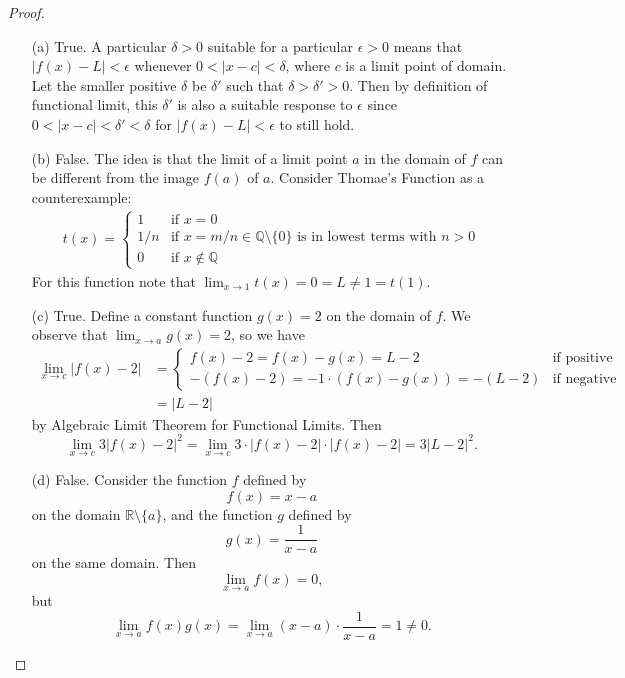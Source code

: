 \documentclass[11pt,twoside, reqno]{amsart}
\theoremstyle{remark}
\def\R{\mathbb R}
\def\Q{\mathbb Q}
\begin{document}
\begin{proof}
\begin{enumerate}
    \item [(a)] True. A particular $\delta > 0$ suitable for a particular $\epsilon > 0$ means that $|f(x) - L| < \epsilon$ whenever $0 < |x - c| < \delta$, where $c$ is a limit point of domain. Let the smaller positive $\delta$ be $\delta'$ such that $\delta > \delta' > 0$. Then by definition of functional limit, this $\delta'$ is also a suitable response to $\epsilon$ since $0 < |x - c| < \delta' < \delta$ for $|f(x) - L| < \epsilon$ to still hold.
    \item [(b)] False. The idea is that the limit of a limit point $a$ in the domain of $f$ can be different from the image $f(a)$ of $a$. Consider Thomae's Function as a counterexample:
    \begin{align*}
        t(x) = 
            \begin{cases}
                1 & \text{if $x = 0$} \\
                1/n & \text{if $x = m/n \in \Q \setminus \{0\}$ is in lowest terms with $n > 0$} \\
                0 & \text{if $x \not \in \Q$}
            \end{cases}
    \end{align*}
    For this function note that $\lim_{x \to 1} t(x) = 0 = L \neq 1 = t(1)$. 
    \item [(c)] True. Define a constant function $g(x) = 2$ on the domain of $f$. We observe that $\lim_{x \to a} g(x) = 2$, so we have
    \begin{align*}
        \lim_{x \to c} |f(x) - 2| & = 
            \begin{cases}
                f(x) - 2 = f(x) - g(x) = L - 2 & \text{if positive} \\
                - (f(x) - 2) = -1 \cdot (f(x) - g(x)) = - (L - 2) & \text{if negative}
            \end{cases}
            \\
            & = |L - 2|
    \end{align*}
    by Algebraic Limit Theorem for Functional Limits. Then
    $$
        \lim_{x \to c} 3|f(x) - 2|^2 = \lim_{x \to c} 3 \cdot |f(x) - 2| \cdot |f(x) - 2| = 3|L - 2|^2.
    $$
    \item [(d)] False. Consider the function $f$ defined by
    $$
        f(x) = x - a
    $$
    on the domain $\R \setminus \{a\}$, and the function $g$ defined by
    $$
        g(x) = \frac{1}{x-a}
    $$
    on the same domain. Then
    $$
        \lim_{x \to a} f(x) = 0,
    $$
    but
    $$
        \lim_{x \to a} f(x)g(x) = \lim_{x \to a} (x - a) \cdot \frac{1}{x-a} = 1 \neq 0.
    $$
\end{enumerate}

\end{proof}
\end{document}
